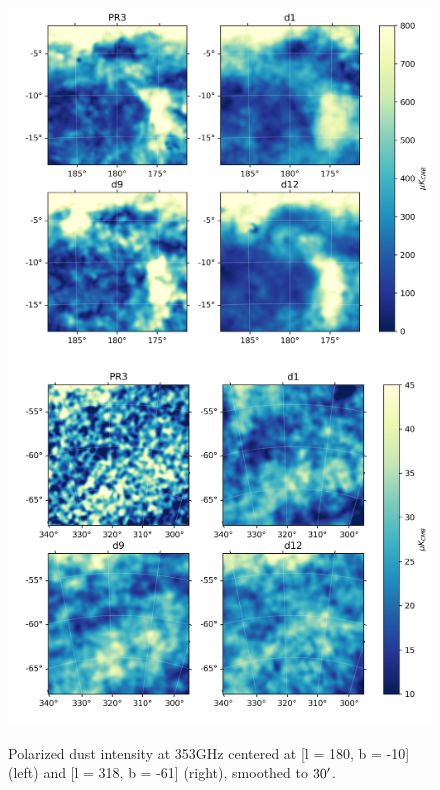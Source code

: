 \documentclass[twocolumn]{aastex631}
\begin{document}
\begin{figure}[t!]
    \centering
    \includegraphics[height=0.41\textwidth]{figures/pol_gal_plane_smooth_30'.png}
    \includegraphics[height=0.41\textwidth]{figures/pol_BK_smooth_30'.png}
    \caption{Polarized dust intensity at 353GHz centered at [l = 180, b = -10] (left) and [l = 318, b = -61] (right), smoothed to $30\mbox{$^\prime$}$.}
    \label{fig:353_pol_int}
\end{figure}

\end{document}
